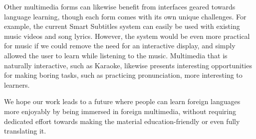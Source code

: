 \documentclass{sigchi}
\begin{document}
Other multimedia forms can likewise benefit from interfaces geared
towards language learning, though each form comes with its own
unique challenges. For example, the current Smart Subtitles system can
easily be used with existing music videos and song lyrics.
However, the system would be even more practical for music if
we could remove the need for an interactive display, and simply
allowed the user to learn while listening to the music.
Multimedia that is naturally interactive, such as Karaoke,
likewise presents interesting opportunities for
making boring tasks, such as practicing pronunciation, more interesting
to learners.

We hope our work leads to a future where people can learn foreign languages more enjoyably by being immersed in foreign multimedia, without requiring dedicated effort towards making the material education-friendly or even fully translating it.

\balance





\end{document}
